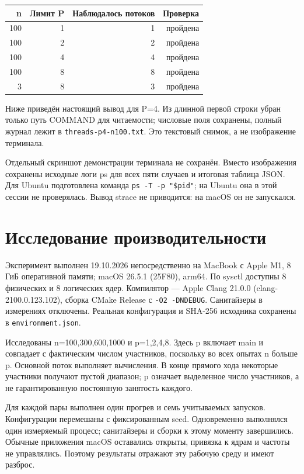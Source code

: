 \begin{center}
\begin{tabular}{rrrr}
\hline n & Лимит P & Наблюдалось потоков & Проверка\\\hline
100 & 1 & 1 & пройдена\\
100 & 2 & 2 & пройдена\\
100 & 4 & 4 & пройдена\\
100 & 8 & 8 & пройдена\\
3 & 8 & 3 & пройдена\\\hline
\end{tabular}
\end{center}
Ниже приведён настоящий вывод для P=4. Из длинной первой строки убран только
путь COMMAND для читаемости; числовые поля сохранены, полный журнал лежит
в \texttt{threads-p4-n100.txt}. Это текстовый снимок, а не изображение терминала.

Отдельный скриншот демонстрации терминала не сохранён. Вместо изображения
сохранены исходные
логи ps для всех пяти случаев и итоговая таблица JSON.
Для Ubuntu подготовлена команда \texttt{ps -T -p "\$pid"}; на Ubuntu она
в этой сессии не проверялась. Вывод strace не приводится: на macOS он не запускался.

\section{Исследование производительности}
Эксперимент выполнен 19.10.2026 непосредственно на MacBook с Apple M1,
8 ГиБ оперативной памяти; macOS 26.5.1 (25F80), arm64. По sysctl доступны
8 физических и 8 логических ядер. Компилятор --- Apple Clang 21.0.0
(clang-2100.0.123.102), сборка CMake Release с \texttt{-O2 -DNDEBUG}.
Санитайзеры в измерениях отключены. Реальная конфигурация и SHA-256 исходника
сохранены в \texttt{environment.json}.

Исследованы n=100,300,600,1000 и p=1,2,4,8. Здесь p включает main и совпадает
с фактическим числом участников, поскольку во всех опытах n больше p.
Основной поток выполняет вычисления. В конце прямого хода некоторые
участники получают пустой диапазон; p означает выделенное число участников,
а не гарантированную постоянную занятость каждого.

Для каждой пары выполнен один прогрев и семь учитываемых запусков.
Конфигурации перемешаны с фиксированным seed. Одновременно выполнялся один
измеряемый процесс; санитайзеры и сборки к этому моменту завершились.
Обычные приложения macOS оставались открыты, привязка к ядрам и частоты
не управлялись. Поэтому результаты отражают эту рабочую среду и имеют разброс.

